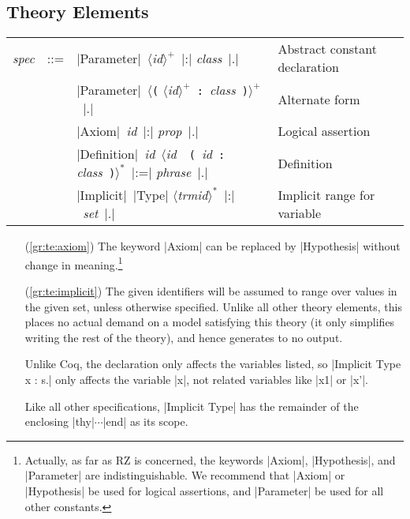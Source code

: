 \documentclass[11pt]{article}
\newcommand{\metav}[1]{\mbox{\textit{#1}}}
\newcommand{\MId}{\metav{mdlid}}
\newcommand{\EId}{\metav{trmid}}
\newcommand{\Id}{\metav{id}}
\newcommand{\Phrase}{\metav{phrase}}
\newcommand{\Class}{\metav{class}}
\newcommand{\Setexp}{\metav{set}}
\newcommand{\Specification}{\metav{spec}}
\newcommand{\Propexp}{\metav{prop}}
\newcommand{\Theoryexp}{\metav{theory}}
\newcommand{\Repeat}[1]{$\langle${}#1{}$\rangle^*$}
\newcommand{\RRepeat}[1]{$\langle${}#1{}$\rangle^+$}
\begin{document}
\iffalse
\noindent Theories can be defined as follows:
\begin{itemize}
\item $\THEORY\ \Theoryname\ [\MParam]^*\ \EQUALS\ \Theoryexp$

   A named theory with the given definitions.  It may be parameterized
   by one or more models; each model parameter, if present, must be written
   with the syntax $\LPAREN \MId \COLON \Theoryexp \RPAREN$.
\end{itemize}
\fi


\subsection{Theory Elements}
\begin{center}
	\begin{tabular}{rRlE}
		\Specification &::=& |Parameter|\ \RRepeat{\Id}\ |:| \Class\ |.|&Abstract constant declaration\label{gr:te:parameter}\\
	 	& \mid & |Parameter|\ \RRepeat{\Verb+(+ \RRepeat{\Id}\ \Verb+:+\ \Class\ \Verb+)+}\ |.|&Alternate form\label{gr:te:parameter2}\\
	    & \mid & |Axiom|\ \Id\ |:| \Propexp\ |.|&Logical assertion\label{gr:te:axiom}\\
		& \mid & |Definition|\ \Id\ \Repeat{\Id\ \textbar\ \Verb+(+\ \Id\ \Verb+:+ \Class\ \Verb+)+}\ |:=| \Phrase\ |.|&Definition\label{gr:te:definition}\\
		& \mid & |Implicit|\ |Type| \Repeat{\EId}\ |:|\ \Setexp\ |.|&Implicit range for variable\label{gr:te:implicit}\\
	\end{tabular}
\end{center}
\begin{itemize}
\item[(\ref{gr:te:axiom})] The keyword |Axiom| can be replaced by |Hypothesis| without change in meaning.\footnote{Actually, as far as RZ is concerned, the keywords |Axiom|, |Hypothesis|, and |Parameter| are indistinguishable.  We recommend that |Axiom| or |Hypothesis| be used for logical assertions, and |Parameter| be used for all other constants.}

\item[(\ref{gr:te:implicit})] 
  The given identifiers will be assumed to range over values in the
  given set, unless otherwise specified.  Unlike all other theory elements, this places no actual demand
  on a model satisfying this theory (it only simplifies writing
  the rest of the theory), and hence generates to
  no output.  

  Unlike Coq, the declaration only affects the variables listed, so
 |Implicit Type x : s.| only affects the variable |x|, not related
variables like |x1| or |x'|.
  
  Like all other specifications, |Implicit Type| has the remainder of the
  enclosing |thy|$\cdots$|end| as its scope.
\end{itemize}
\end{document}
